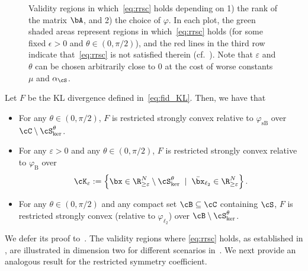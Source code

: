 \documentclass[11pt]{amsart}
\begin{document}
\begin{figure}[htbp]
\begin{tikzpicture}[x=0.65pt,y=0.65pt,yscale=-1,xscale=1]
\end{tikzpicture}
    
    \caption{Validity regions in which~\cref{eq:rrsc} holds depending on 1) the rank of the matrix $\bA$, and 2) the choice of $\varphi$. In each plot, the green shaded areas represent regions in which~\cref{eq:rrsc} holds (for some fixed $\epsilon >0$ and $\theta \in (0,\pi/2)$), and the red lines in the third row indicate that~\cref{eq:rrsc} is not satisfied therein (cf.~). Note that $\varepsilon$ and $\theta$ can be chosen arbitrarily close to $0$ at the cost of worse constants $\mu$ and $\alpha_\cS$.}
    \label{fig:valid_regions}
\end{figure}

\begin{proposition}\label{prop:rrsc for KL}
Let $F$ be the KL divergence  defined in~\cref{eq:fid_KL}. Then, we have that
\begin{itemize}
\item  For any $\theta\in(0,\pi/2)$, $F$ is restricted strongly convex relative to $\varphi_{\mathrm{sB}}$ over $\cC \setminus \cS^{\theta}_{\ker}$.
\item For any $\varepsilon>0$ and any $\theta\in(0,\pi/2)$, $F$ is restricted strongly convex relative to  $\varphi_\mathrm{B}$ over 
\begin{equation} \label{eq:linconv_set_for_Burg}
\cK_\varepsilon:= \left\lbrace  \bx \in \R^N_{\geq \varepsilon} \setminus \cS^{\theta}_{\ker} \;\mid\; \bar \bx_{\ell_2} \in \R^N_{\geq \varepsilon}\right\rbrace.
\end{equation} 
\item For any $\theta\in(0,\pi/2)$ and any compact set $\cB \subseteq \cC $ containing $\cS$, $F$ is restricted strongly convex (relative to $\varphi_\mathrm{\ell_2}$) over  $\cB \setminus \cS^{\theta}_{\ker}$. 
\end{itemize}
\end{proposition}

We defer its proof to~. The validity regions where \eqref{eq:rrsc} holds, as established in , are illustrated in dimension two for different scenarios in~. We next provide an analogous result for the restricted symmetry coefficient. 
\end{document}
